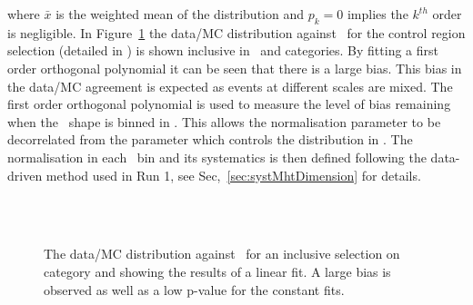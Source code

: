 where $\bar{x}$ is the weighted mean of the distribution and $p_k = 0$ 
implies the $k^{th}$ order is negligible.
In Figure~\ref{fig:linearMotiv} the data/MC 
distribution against \mht~for the control region selection 
(detailed in \cite{Khachatryan:2016pxa}) is shown inclusive 
in \scalht~and categories. By fitting a first order
orthogonal polynomial it can be seen that there is a large bias. 
This bias in the data/MC agreement is expected as events 
at different scales are mixed.
The first order orthogonal polynomial
is used to measure the level of bias remaining 
when the \mht~shape is binned in \scalht.
This allows the normalisation parameter to be
decorrelated from the parameter which controls
the distribution in \mht.
The normalisation in each \scalht~bin and its systematics 
is then defined following the data-driven method used in Run 1, see Sec,~\ref{sec:systMhtDimension} for details.
\begin{figure}[h!]
  \centering
  ~~
  \\
  \\
  \caption{\label{fig:linearMotiv} 
  The data/MC distribution against \mht~for an inclusive selection on category and \scalht
  showing the results of a linear fit. A large bias is observed as well as a low p-value for the constant fits. 
 }
\end{figure}

